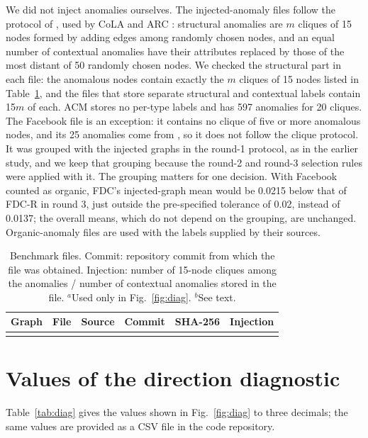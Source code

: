 \documentclass[pdflatex,sn-mathphys-ay]{sn-jnl}
\theoremstyle{plain}
\theoremstyle{remark}
\begin{document}
\begin{appendices}
We did not inject anomalies ourselves. The injected-anomaly files follow the protocol of \citet{ding2019deep}, used by CoLA and ARC \citep{liu2021cola,liu2024arc}: structural anomalies are $m$ cliques of 15 nodes formed by adding edges among randomly chosen nodes, and an equal number of contextual anomalies have their attributes replaced by those of the most distant of 50 randomly chosen nodes. We checked the structural part in each file: the anomalous nodes contain exactly the $m$ cliques of 15 nodes listed in Table~\ref{tab:files}, and the files that store separate structural and contextual labels contain 15$m$ of each. ACM stores no per-type labels and has 597 anomalies for 20 cliques. The Facebook file is an exception: it contains no clique of five or more anomalous nodes, and its 25 anomalies come from \citet{xu2022contrastive}, so it does not follow the clique protocol. It was grouped with the injected graphs in the round-1 protocol, as in the earlier study, and we keep that grouping because the round-2 and round-3 selection rules were applied with it. The grouping matters for one decision. With Facebook counted as organic, FDC's injected-graph mean would be 0.0215 below that of FDC-R in round 3, just outside the pre-specified tolerance of 0.02, instead of 0.0137; the overall means, which do not depend on the grouping, are unchanged. Organic-anomaly files are used with the labels supplied by their sources.

\begin{table}[h]
\caption{Benchmark files. Commit: repository commit from which the file was obtained. Injection: number of 15-node cliques among the anomalies / number of contextual anomalies stored in the file. $^{a}$Used only in Fig.~\ref{fig:diag}. $^{b}$See text.}
\label{tab:files}
\scriptsize
\setlength{\tabcolsep}{2pt}
\begin{tabular*}{\textwidth}{@{\extracolsep{\fill}}llllll@{}}
\toprule
Graph & File & Source & Commit & SHA-256 & Injection \\
\midrule

\botrule
\end{tabular*}
\end{table}

\section{Values of the direction diagnostic}\label{app:diag}
\setcounter{table}{0}

Table~\ref{tab:diag} gives the values shown in Fig.~\ref{fig:diag} to three decimals; the same values are provided as a CSV file in the code repository.


\end{appendices}
\end{document}
